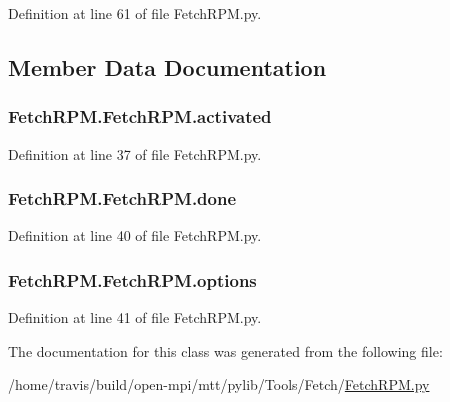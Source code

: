 Definition at line 61 of file Fetch\-R\-P\-M.\-py.



\subsection{Member Data Documentation}
\hypertarget{class_fetch_r_p_m_1_1_fetch_r_p_m_a9f6cabfb9636d52b2d183f4e94719b01}{
\subsubsection[{activated}]{\setlength{\rightskip}{0pt plus 5cm}Fetch\-R\-P\-M.\-Fetch\-R\-P\-M.\-activated}}\label{class_fetch_r_p_m_1_1_fetch_r_p_m_a9f6cabfb9636d52b2d183f4e94719b01}


Definition at line 37 of file Fetch\-R\-P\-M.\-py.

\hypertarget{class_fetch_r_p_m_1_1_fetch_r_p_m_a3748f8f056ba42647c310c4214b54e1f}{
\subsubsection[{done}]{\setlength{\rightskip}{0pt plus 5cm}Fetch\-R\-P\-M.\-Fetch\-R\-P\-M.\-done}}\label{class_fetch_r_p_m_1_1_fetch_r_p_m_a3748f8f056ba42647c310c4214b54e1f}


Definition at line 40 of file Fetch\-R\-P\-M.\-py.

\hypertarget{class_fetch_r_p_m_1_1_fetch_r_p_m_a39376323f8fd2895b9f9beaeded740be}{
\subsubsection[{options}]{\setlength{\rightskip}{0pt plus 5cm}Fetch\-R\-P\-M.\-Fetch\-R\-P\-M.\-options}}\label{class_fetch_r_p_m_1_1_fetch_r_p_m_a39376323f8fd2895b9f9beaeded740be}


Definition at line 41 of file Fetch\-R\-P\-M.\-py.



The documentation for this class was generated from the following file\-:\begin{DoxyCompactItemize}
\item 
/home/travis/build/open-\/mpi/mtt/pylib/\-Tools/\-Fetch/\hyperlink{_fetch_r_p_m_8py}{Fetch\-R\-P\-M.\-py}\end{DoxyCompactItemize}

